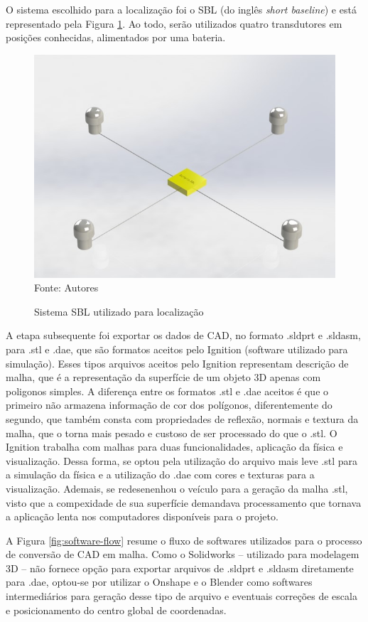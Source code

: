 O sistema escolhido para a localização foi o SBL (do inglês \textit{short baseline}) e está representado pela Figura \ref{fig:sbl}. Ao todo, serão utilizados quatro transdutores em posições conhecidas, alimentados por uma bateria.

\begin{figure}[h]
	\centering
	\caption[Sistema SBL utilizado para localização]{Sistema SBL utilizado para localização}
	\label{fig:sbl}
	\includegraphics[width=0.7\linewidth]{images/sbl}\\
	\footnotesize Fonte: Autores
\end{figure}

A etapa subsequente foi exportar os dados de CAD, no formato .sldprt e .sldasm, para .stl e .dae, que são formatos aceitos pelo Ignition (software utilizado para simulação). Esses tipos arquivos aceitos pelo Ignition representam descrição de malha, que é a representação da superfície de um objeto 3D apenas com poligonos simples. A diferença entre os formatos .stl e .dae aceitos é que o primeiro não armazena informação de cor dos polígonos, diferentemente do segundo, que também consta com propriedades de reflexão, normais e textura da malha, que o torna mais pesado e custoso de ser processado do que o .stl. O Ignition trabalha com malhas para duas funcionalidades, aplicação da física e visualização. Dessa forma, se optou pela utilização do arquivo mais leve .stl para a simulação da física e a utilização do .dae com cores e texturas para a visualização. Ademais, se redesenenhou o veículo para a geração da malha .stl, visto que a compexidade de sua superfície demandava processamento que tornava a aplicação lenta nos computadores disponíveis para o projeto.

 A Figura \ref{fig:software-flow} resume o fluxo de softwares utilizados para o processo de conversão de CAD em malha. Como o Solidworks -- utilizado para modelagem 3D -- não fornece opção para exportar arquivos de .sldprt e .sldasm diretamente para .dae, optou-se por utilizar o Onshape e o Blender como softwares intermediários para geração desse tipo de arquivo e eventuais correções de escala e posicionamento do centro global de coordenadas.

